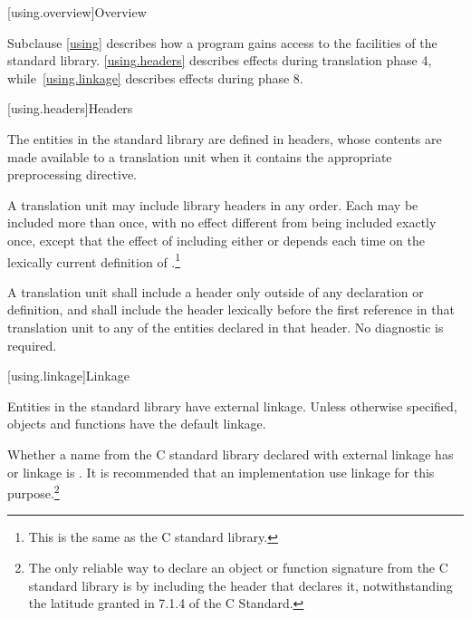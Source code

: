 [using.overview]{Overview}

\pnum
Subclause \ref{using} describes how a \Cpp{} program gains access to the facilities of the
\Cpp{} standard library. \ref{using.headers} describes effects during translation
phase 4, while~\ref{using.linkage} describes effects during phase
8.

[using.headers]{Headers}

\pnum
The entities in the \Cpp{} standard library are defined in headers,
whose contents are made available to a translation unit when it contains the appropriate
%
preprocessing directive.%
%

\pnum
A translation unit may include library headers in any order.
%
Each may be included more than once, with no effect different from
being included exactly once, except that the effect of including either
or
depends each time on the lexically
%
%
current definition of
%
%
.\footnote{This is the same as the C standard library.}

\pnum
A translation unit shall include a header only outside of any
%
declaration or definition, and shall include the header lexically
before the first reference in that translation unit to any of the entities
declared in that header. No diagnostic is required.

[using.linkage]{Linkage}

\pnum
Entities in the \Cpp{} standard library have external linkage.
Unless otherwise specified, objects and functions have the default
linkage.

\pnum
{}%
Whether a name from the C standard library declared with
external linkage has
%
%
%
or
%
linkage is . It is recommended that an
implementation use
linkage for this purpose.\footnote{The only reliable way to declare an object or
function signature from the C standard library is by including the header that
declares it, notwithstanding the latitude granted in 7.1.4 of the C
Standard.}

